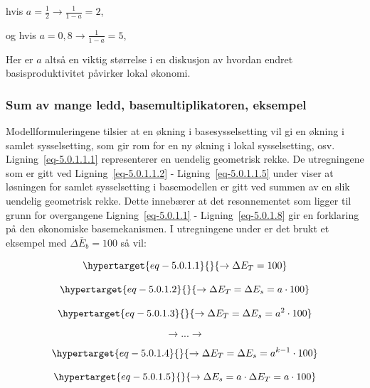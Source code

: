 \documentclass[
]{article}
\begin{document}
hvis \(a = \frac{1}{2} \rightarrow \frac{1}{1-a} = 2\),

og hvis \(a = 0,8 \rightarrow \frac{1}{1-a} = 5\),

Her er \(a\) altså en viktig størrelse i en diskusjon av hvordan endret
basisproduktivitet påvirker lokal økonomi.

\hypertarget{sum-av-mange-ledd-basemultiplikatoren-eksempel}{%
\subsubsection{Sum av mange ledd, basemultiplikatoren,
eksempel}\label{sum-av-mange-ledd-basemultiplikatoren-eksempel}}

Modellformuleringene tilsier at en økning i basesysselsetting vil gi en
økning i samlet sysselsetting, som gir rom for en ny økning i lokal
sysselsetting, osv. Ligning~\ref{eq-5.0.1.1.1} representerer en uendelig
geometrisk rekke. De utregningene som er gitt ved
Ligning~\ref{eq-5.0.1.1.2} - Ligning~\ref{eq-5.0.1.1.5} under viser at
løsningen for samlet sysselsetting i basemodellen er gitt ved summen av
en slik uendelig geometrisk rekke. Dette innebærer at det resonnementet
som ligger til grunn for overgangene Ligning~\ref{eq-5.0.1.1} -
Ligning~\ref{eq-5.0.1.8} gir en forklaring på den økonomiske
basemekanismen. I utregningene under er det brukt et eksempel med
\(\Delta \bar{E}_b = 100\) så vil:

\begin{equation}\protect\hypertarget{eq-5.0.1.1}{}{
\rightarrow \Delta E_T = 100
}\label{eq-5.0.1.1}\end{equation}

\begin{equation}\protect\hypertarget{eq-5.0.1.2}{}{
\rightarrow \Delta E_T = \Delta E_s = a \cdot 100
}\label{eq-5.0.1.2}\end{equation}

\begin{equation}\protect\hypertarget{eq-5.0.1.3}{}{
\rightarrow \Delta E_T = \Delta E_s = a^2 \cdot 100
}\label{eq-5.0.1.3}\end{equation}

\[
\rightarrow ... \rightarrow
\]

\begin{equation}\protect\hypertarget{eq-5.0.1.4}{}{
\rightarrow \Delta E_T = \Delta E_s = a^{k-1} \cdot 100
}\label{eq-5.0.1.4}\end{equation}

\begin{equation}\protect\hypertarget{eq-5.0.1.5}{}{
\rightarrow \Delta E_s = a\cdot \Delta E_T = a \cdot 100
}\label{eq-5.0.1.5}\end{equation}
\end{document}
